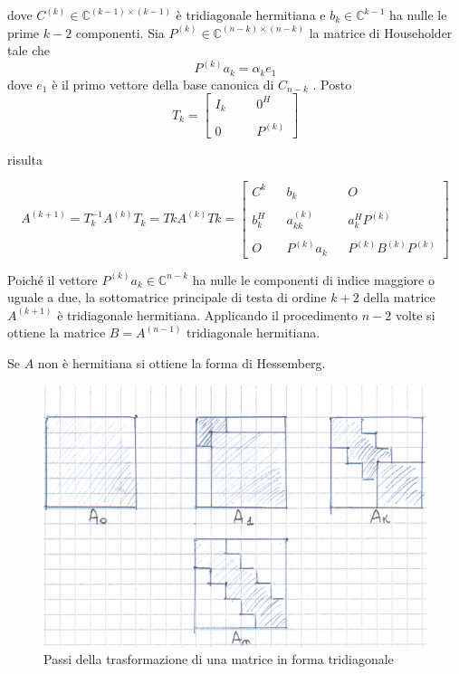 dove $C^{(k)} \in \mathbb{C}^{(k-1) \times (k-1)}$ \`e tridiagonale hermitiana e
$b_k \in  \mathbb{C}^{k-1}$ ha nulle le
prime $k-2$ componenti. Sia $P^{(k)} \in \mathbb{C}^{(n-k) \times (n-k)}$
la matrice di Householder tale che
$$P^{(k)} a_k = \alpha_k e_1$$
dove $e_1$ \`e il primo vettore della base canonica di $C_{n-k}$ .
Posto
$$
T_k =
\left[
\begin{array}{llll}
I_k & & & 0^{H}                                    \\
 & & &                                             \\
0  & & & P^{(k)}
\end{array}
\right]
$$

risulta

$$A^{(k+1)} = T_k^{-1} A^{(k)} T_k = TkA^{(k)} Tk =
\left[
\begin{array}{ccccc}
  C^{k}   &  & b_k          &  & O              \\
          &  &              &  &                \\
  b_k^{H} &  & a_{kk}^{(k)} &  & a_k^{H}P^{(k)} \\
          &  &              &  &                \\
  O       &  & P^{(k)}a_k   &  & P^{(k)}B^{(k)} P^{(k)}
\end{array}
\right]
$$

Poich\'e il vettore $P^{(k)} a_k \in \mathbb{C}^{n−k}$ ha nulle le
componenti di indice maggiore o uguale a due, la sottomatrice
principale di testa di ordine $k+2$ della matrice $A^{(k+1)}$ \`e
tridiagonale hermitiana. Applicando il procedimento $n - 2$ volte si
ottiene la matrice $B = A^{(n−1)}$ tridiagonale hermitiana.

Se $A$ non è hermitiana si ottiene la forma di Hessemberg.
\begin{figure}[h]
 \centering
 \includegraphics{./imgs/tridiagonal.png}
 \caption{Passi della trasformazione di una matrice in forma tridiagonale}
\end{figure}


